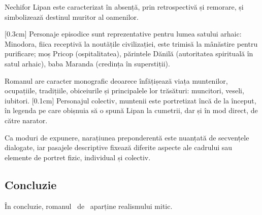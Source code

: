 Nechifor Lipan este caracterizat în absență, prin retrospectivă și remorare, și simbolizează destinul muritor al oamenilor.

[0.3cm]
Personaje episodice sunt reprezentative pentru lumea satului arhaic: Minodora, fiica receptivă la noutățile civilizației, este trimisă la mânăstire pentru purificare; moș Pricop (ospitalitatea), părintele Dănilă (autoritatea spirituală în satul arhaic), baba Maranda (credința în superstiții).

Romanul are caracter monografic deoarece înfățișează viața muntenilor, ocupațiile, tradițiile, obiceiurile și principalele lor trăsături: muncitori, veseli, iubitori.
[0.1cm]
Personajul colectiv, muntenii este portretizat încă de la început, în legenda pe care obișnuia să o spună Lipan la cumetrii, dar și în mod direct, de către narator.

Ca moduri de expunere, narațiunea preponderentă este nuanțată de secvențele dialogate, iar pasajele descriptive fixează diferite aspecte ale cadrului sau elemente de portret fizic, individual și colectiv.


\subsection{Concluzie}
În concluzie, romanul \operatitle\ de \operaauthor\ aparține realismului mitic.

